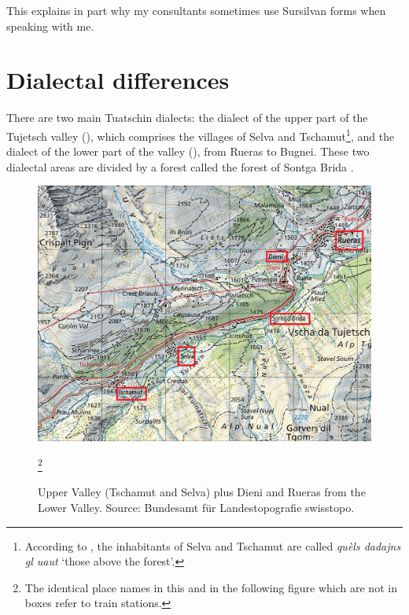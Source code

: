 This explains in part why my consultants sometimes use Sursilvan forms when speaking with me.

\section{Dialectal differences}
There are two main Tuatschin dialects: the dialect of the upper part of the Tujetsch valley (), which comprises the villages of Selva and Tschamut\footnote{According to , the inhabitants of Selva and Tschamut are called \textit{quèls dadajns gl uaut} `those above the forest'.}, and the dialect of the lower part of the valley (), from Rueras to Bugnei. These two dialectal areas are divided by a forest called the forest of Sontga Brida \citep[3]{Caduff1952}. 

\begin{figure}
	\includegraphics[height=.5\textheight]{figures/Upper Valley.png}
	\caption{Upper Valley (Tschamut and Selva) plus Dieni and Rueras from the Lower Valley. Source: Bundesamt für Landestopografie swisstopo.}\footnote{The identical place names in this and in the following figure which are not in boxes refer to train stations.}
	\label{fig:uppervalley}
\end{figure}

